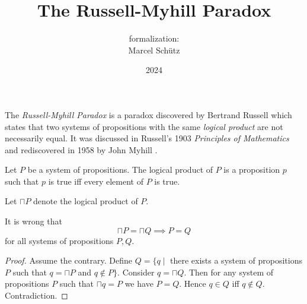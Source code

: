 \documentclass{article}
\title{The Russell-Myhill Paradox}
\author{\Naproche formalization:\\[0.5em]Marcel Schütz}
\date{2024}
\begin{document}
  \maketitle


  \noindent The \emph{Russell-Myhill Paradox} is a paradox discovered by 
  Bertrand Russell which states that two systems of propositions with the same 
  \emph{logical product} are not necessarily equal.
  It was discussed in Russell's 1903 \emph{Principles of Mathematics}
  \cite[Appendix B]{Russell1903} and rediscovered in 1958 by John Myhill
  \cite{Myhill1958}.

  \begin{forthel}
    \begin{signature*}
      Let $P$ be a system of propositions.
      The logical product of $P$ is a proposition $p$ such that $p$ is true iff every element of $P$ is true.
    \end{signature*}
    
    Let $\sqcap P$ denote the logical product of $P$.
    
    \begin{theorem*}[title=Russell-Myhill Paradox,id=russell_myhill_paradox]
      It is wrong that
      \[ \sqcap P = \sqcap Q \implies P = Q \]
      for all systems of propositions $P, Q$.
    \end{theorem*}
    \begin{proof}
      Assume the contrary.
      Define $Q = \{q \mid$ there exists a system of propositions $P$ such that $q = \sqcap P$ and $q \notin P\}$.
      Consider $q = \sqcap Q$.
      Then for any system of propositions $P$ such that $\sqcap q = P$ we have $P = Q$.
      Hence $q \in Q$ iff $q \notin Q$.
      Contradiction.
    \end{proof}
  \end{forthel}

  \printbibliography
\end{document}
